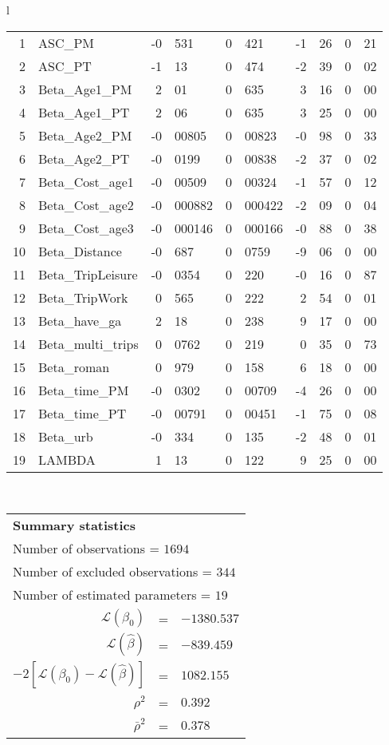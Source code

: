 \begin{tabular}{l}
\begin{tabular}{rlr@{.}lr@{.}lr@{.}lr@{.}l}
1 & ASC_PM  & -0&531 & 0&421 & -1&26 & 0&21\\
2 & ASC_PT & -1&13 & 0&474 & -2&39 & 0&02\\
3 & Beta_Age1_PM & 2&01 & 0&635 & 3&16 & 0&00\\
4 & Beta_Age1_PT & 2&06 & 0&635 & 3&25 & 0&00\\
5 & Beta_Age2_PM & -0&00805 & 0&00823 & -0&98 & 0&33\\
6 & Beta_Age2_PT & -0&0199 & 0&00838 & -2&37 & 0&02\\
7 & Beta_Cost_age1 & -0&00509 & 0&00324 & -1&57 & 0&12\\
8 & Beta_Cost_age2 & -0&000882 & 0&000422 & -2&09 & 0&04\\
9 & Beta_Cost_age3 & -0&000146 & 0&000166 & -0&88 & 0&38\\
10 & Beta_Distance & -0&687 & 0&0759 & -9&06 & 0&00\\
11 & Beta_TripLeisure & -0&0354 & 0&220 & -0&16 & 0&87\\
12 & Beta_TripWork & 0&565 & 0&222 & 2&54 & 0&01\\
13 & Beta_have_ga & 2&18 & 0&238 & 9&17 & 0&00\\
14 & Beta_multi_trips & 0&0762 & 0&219 & 0&35 & 0&73\\
15 & Beta_roman & 0&979 & 0&158 & 6&18 & 0&00\\
16 & Beta_time_PM & -0&0302 & 0&00709 & -4&26 & 0&00\\
17 & Beta_time_PT & -0&00791 & 0&00451 & -1&75 & 0&08\\
18 & Beta_urb & -0&334 & 0&135 & -2&48 & 0&01\\
19 & LAMBDA & 1&13 & 0&122 & 9&25 & 0&00\\
\hline
\end{tabular}
\\
\begin{tabular}{rcl}
\multicolumn{3}{l}{\bf Summary statistics}\\
\multicolumn{3}{l}{ Number of observations = $1694$} \\
\multicolumn{3}{l}{ Number of excluded observations = $344$} \\
\multicolumn{3}{l}{ Number of estimated  parameters = $19$} \\
 $\mathcal{L}(\beta_0)$ &=&  $-1380.537$ \\
 $\mathcal{L}(\hat{\beta})$ &=& $-839.459 $  \\
 $-2[\mathcal{L}(\beta_0) -\mathcal{L}(\hat{\beta})]$ &=& $1082.155$ \\
    $\rho^2$ &=&   $0.392$ \\
    $\bar{\rho}^2$ &=&    $0.378$ \\
\end{tabular}
  \end{tabular}
